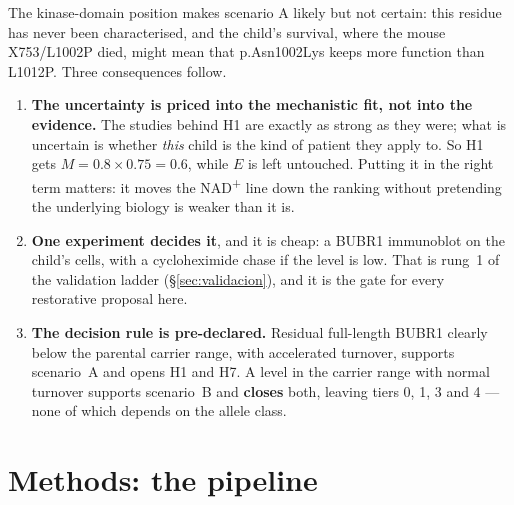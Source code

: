 \documentclass[10pt]{article}
\begin{document}
\noindent The kinase-domain position makes scenario A likely but not certain: this residue has never been
characterised, and the child's survival, where the mouse X753/L1002P died, might mean that p.Asn1002Lys keeps more function than L1012P. Three consequences follow.

\begin{enumerate}
\item \textbf{The uncertainty is priced into the mechanistic fit, not into the evidence.} The studies behind H1
  are exactly as strong as they were; what is uncertain is whether \emph{this} child is the kind of patient they
  apply to. So H1 gets $M = 0.8 \times 0.75 = 0.6$, while $E$ is left untouched. Putting it in the right term matters:
  it moves the NAD\textsuperscript{+} line down the ranking without pretending the underlying biology is weaker than it is.
\item \textbf{One experiment decides it}, and it is cheap: a BUBR1 immunoblot on the child's cells, with a
  cycloheximide chase if the level is low. That is rung~1 of the validation ladder (§\ref{sec:validacion}), and it
  is the gate for every restorative proposal here.
\item \textbf{The decision rule is pre-declared.} Residual full-length BUBR1 clearly below the parental carrier
  range, with accelerated turnover, supports scenario~A and opens H1 and H7. A level in the carrier range with
  normal turnover supports scenario~B and \textbf{closes} both, leaving tiers 0, 1, 3 and 4 --- none of which
  depends on the allele class.
\end{enumerate}

\section{Methods: the pipeline}
\label{sec:metodo}
\end{document}
